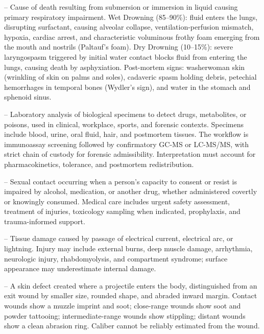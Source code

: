 -- Cause of death resulting from submersion or immersion in liquid causing primary respiratory impairment. Wet Drowning (85--90\%): fluid enters the lungs, disrupting surfactant, causing alveolar collapse, ventilation-perfusion mismatch, hypoxia, cardiac arrest, and characteristic voluminous frothy foam emerging from the mouth and nostrils (Paltauf's foam). Dry Drowning (10--15\%): severe laryngospasm triggered by initial water contact blocks fluid from entering the lungs, causing death by asphyxiation. Post-mortem signs: washerwoman skin (wrinkling of skin on palms and soles), cadaveric spasm holding debris, petechial hemorrhages in temporal bones (Wydler's sign), and water in the stomach and sphenoid sinus.

-- Laboratory analysis of biological specimens to detect drugs, metabolites, or poisons, used in clinical, workplace, sports, and forensic contexts. Specimens include blood, urine, oral fluid, hair, and postmortem tissues. The workflow is immunoassay screening followed by confirmatory GC-MS or LC-MS/MS, with strict chain of custody for forensic admissibility. Interpretation must account for pharmacokinetics, tolerance, and postmortem redistribution.

-- Sexual contact occurring when a person's capacity to consent or resist is impaired by alcohol, medication, or another drug, whether administered covertly or knowingly consumed. Medical care includes urgent safety assessment, treatment of injuries, toxicology sampling when indicated, prophylaxis, and trauma-informed support.

-- Tissue damage caused by passage of electrical current, electrical arc, or lightning. Injury may include external burns, deep muscle damage, arrhythmia, neurologic injury, rhabdomyolysis, and compartment syndrome; surface appearance may underestimate internal damage.

-- A skin defect created where a projectile enters the body, distinguished from an exit wound by smaller size, rounded shape, and abraded inward margin. Contact wounds show a muzzle imprint and soot; close-range wounds show soot and powder tattooing; intermediate-range wounds show stippling; distant wounds show a clean abrasion ring. Caliber cannot be reliably estimated from the wound.

